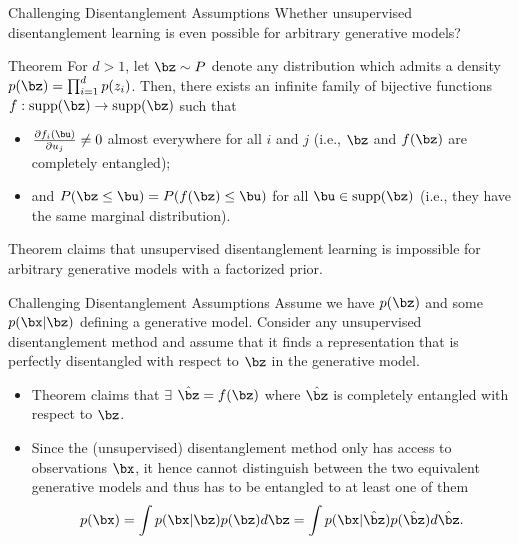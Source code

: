 \begin{frame}{Challenging Disentanglement Assumptions}
	Whether unsupervised disentanglement learning is even possible for arbitrary generative models?
	
	\begin{block}{Theorem}
		For $d > 1$, let $\bz \sim P$ denote any distribution which admits a density $p(\bz) = \prod^d_{i=1} p(z_i)$. Then, there exists an infinite family of bijective functions $f : \text{supp}(\bz) \rightarrow \text{supp}(\bz)$ such that
		\begin{itemize}
			\item $\frac{\partial f_i(\bu)}{\partial u_j} \neq 0$ almost everywhere for all $i$ and $j$ (i.e., $\bz$ and $f(\bz)$ are completely entangled);
			\item and $P(\bz \leq \bu) = P(f(\bz) \leq \bu)$ for all $\bu \in \text{supp}(\bz)$ (i.e., they
			have the same marginal distribution).
		\end{itemize}  
	\end{block}

	Theorem claims that unsupervised disentanglement learning is impossible for arbitrary generative models with a factorized prior.
	
\end{frame}
\begin{frame}{Challenging Disentanglement Assumptions}
	Assume we have $p(\bz)$ and some $p(\bx|\bz)$ defining a generative model. Consider any unsupervised
	disentanglement method and assume that it finds a representation that is perfectly disentangled with respect
	to $\bz$ in the generative model.
	\begin{itemize}
		\item Theorem claims that $\exists$ $\hat{\bz} = f(\bz)$ where $\hat{\bz}$ is completely entangled
		with respect to $\bz$.
		\item Since the (unsupervised) disentanglement method only has access to
		observations $\bx$, it hence cannot distinguish between the two equivalent generative models and thus has to be entangled to at least one of them
		\[
			p(\bx) = \int p(\bx | \bz) p(\bz) d\bz = \int p(\bx | \hat{\bz})p(\hat{\bz}) d \hat{\bz}.
		\]
	\end{itemize}

\end{frame}
